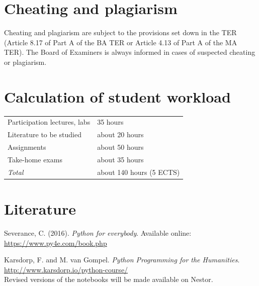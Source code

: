 \documentclass[a4paper,12pt]{article}
\begin{document}
\section{Cheating and plagiarism}
Cheating and plagiarism are subject to the provisions set down in the TER
(Article 8.17 of Part A of the BA TER or Article 4.13 of Part A of the MA TER).
The Board of Examiners is always informed in cases of suspected cheating or
plagiarism.

\section{Calculation of student workload}
\begin{tabular}{ll}
    Participation lectures, labs   & 35 hours \\
    Literature to be studied       & about 20 hours \\
    Assignments                    & about 50 hours \\
    Take-home exams                & about 35 hours \\
    \emph{Total}                   & about 140 hours (5 ECTS) \\
\end{tabular}

\section{Literature}
Severance, C. (2016). \emph{Python for everybody}.
Available online: \url{https://www.py4e.com/book.php}

Karsdorp, F. and M. van Gompel. \emph{Python Programming for the Humanities}.
\url{http://www.karsdorp.io/python-course/} \\
Revised versions of the notebooks will be made available on Nestor.

%
%
\end{document}

